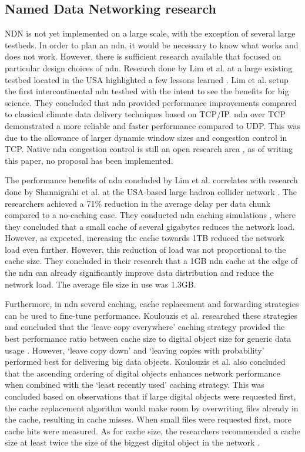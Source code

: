 \documentclass[conference]{IEEEtran}
\begin{document}
\subsection{Named Data Networking research}
NDN is not yet implemented on a large scale, with the exception of several large testbeds. In order to plan an \gls{ndn}, it would be necessary to know what works and does not work. However, there is sufficient research available that focused on particular design choices of \gls{ndn}. Research done by Lim et al. at a large existing testbed located in the USA highlighted a few lessons learned \cite{lim2018ndn}. Lim et al. setup the first intercontinental \gls{ndn} testbed with the intent to see the benefits for big science. They concluded that \gls{ndn} provided performance improvements compared to classical climate data delivery techniques based on TCP/IP. \gls{ndn} over TCP demonstrated a more reliable and faster performance compared to UDP. This was due to the allowance of larger dynamic window sizes and congestion control in TCP. Native \gls{ndn} congestion control is still an open research area \cite{ren2016congestion}, as of writing this paper, no proposal has been implemented.

The performance benefits of \gls{ndn} concluded by Lim et al. correlates with research done by Shannigrahi et al. at the USA-based large hadron collider network \cite{shannigrahi2015named}. The researchers achieved a 71\% reduction in the average delay per data chunk compared to a no-caching case. They conducted \gls{ndn} caching simulations \cite{shannigrahi2017request}, where they concluded that a small cache of several gigabytes reduces the network load. However, as expected, increasing the cache towards 1TB reduced the network load even further. However, this reduction of load was not proportional to the cache size. They concluded in their research that a 1GB \gls{ndn} cache at the edge of the \gls{ndn} can already significantly improve data distribution and reduce the network load. The average file size in use was 1.3GB.

Furthermore, in \gls{ndn} several caching, cache replacement and forwarding strategies can be used to fine-tune performance. Koulouzis et al. researched these strategies and concluded that the `leave copy everywhere' caching strategy provided the best performance ratio between cache size to digital object size for generic data usage \cite{koulouzis2018information}. However, `leave copy down' and `leaving copies with probability' performed best for delivering big data objects. Koulouzis et al. also concluded that the ascending ordering of digital objects enhances network performance when combined with the `least recently used' caching strategy. This was concluded based on observations that if large digital objects were requested first, the cache replacement algorithm would make room by overwriting files already in the cache, resulting in cache misses. When small files were requested first, more cache hits were measured. As for cache size, the researchers recommended a cache size at least twice the size of the biggest digital object in the network \cite{koulouzis2018information}.
\end{document}
